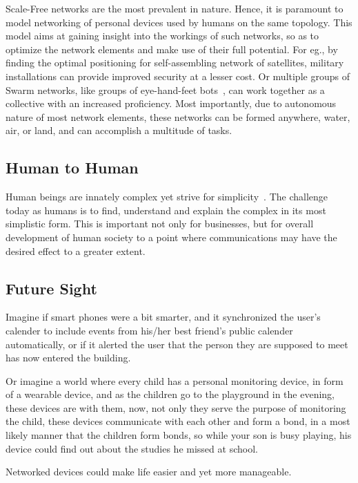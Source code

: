 Scale-Free networks are the most prevalent in nature. Hence, it is paramount to model networking of personal devices used by humans on the same topology. 
This model aims at gaining insight into the workings of such networks, so as to optimize the network elements and make use of their full potential. For eg., by finding the optimal positioning for self-assembling network of satellites, military installations can provide improved security at a lesser cost. Or multiple groups of Swarm networks, like groups of eye-hand-feet bots~\cite{swarm..robots}, can work together as a collective with an increased proficiency.  Most importantly, due to autonomous nature of most network elements, these networks can be formed anywhere, water, air, or land, and can accomplish a multitude of tasks.

\subsection{Human to Human}
Human beings are innately complex yet strive for simplicity~\cite{h2h}. The challenge today as humans is to find, understand and explain the complex in its most simplistic form. This is important not only for businesses, but for overall development of human society to a point where communications may have the desired effect to a greater extent.


\subsection{Future Sight}

Imagine if smart phones were a bit smarter, and it synchronized the user's calender to include events from his/her best friend's public calender automatically, or if it alerted the user that the person they are supposed to meet has now entered the building.

Or imagine a world where every child has a personal monitoring device, in form of a wearable device, and as the children go to the playground in the evening, these devices are with them, now, not only they serve the purpose of monitoring the child, these devices communicate with each other and form a bond, in a most likely manner that the children form bonds, so while your son is busy playing, his device could find out about the studies he missed at school.

Networked devices could make life easier and yet more manageable.



